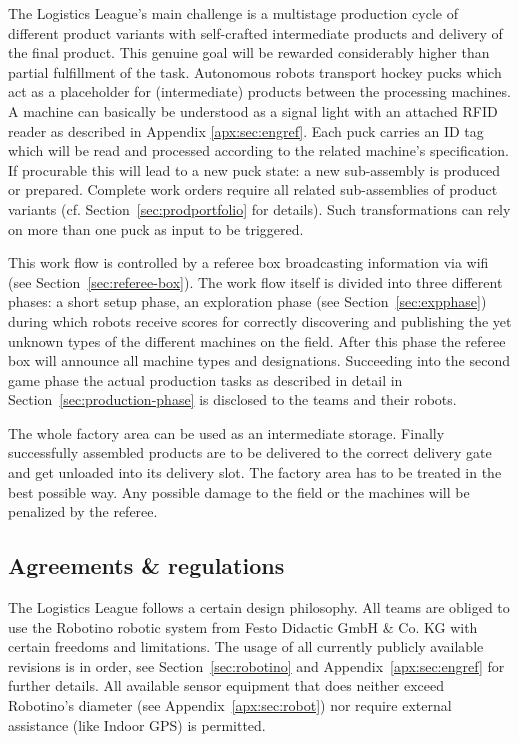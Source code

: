 \documentclass[12pt,twoside]{article}
\newcommand{\refsec}[1]{Section~\ref{#1}}
\begin{document}
The Logistics League's main challenge is a multistage production
cycle of different product variants with self-crafted intermediate
products and delivery of the final product. This genuine goal will be
rewarded considerably higher than partial fulfillment of the task.
Autonomous robots transport hockey pucks which act as a placeholder
for (intermediate) products between the processing machines. A machine
can basically be understood as a signal light with an attached RFID
reader as described in Appendix \ref{apx:sec:engref}. Each puck
carries an ID tag which will be read and processed according to the
related machine's specification. If procurable this will lead to a new
puck state: a new sub-assembly is produced or prepared. Complete
work orders require all related sub-assemblies of product variants (cf.
\refsec{sec:prodportfolio} for details). Such transformations can rely
on more than one puck as input to be triggered.

This work flow is controlled by a referee box broadcasting information
via wifi (see \refsec{sec:referee-box}). The work flow itself is
divided into three different phases: a short setup phase, an
exploration phase (see \refsec{sec:expphase}) during which robots
receive scores for correctly discovering and publishing the yet
unknown types of the different machines on the field. After this phase
the referee box will announce all machine types and
designations. Succeeding into the second game phase the actual
production tasks as described in detail in
\refsec{sec:production-phase} is disclosed to the teams and their
robots.

The whole factory area can be used as an intermediate storage. Finally
successfully assembled products are to be delivered to the correct
delivery gate and get unloaded into its delivery slot. The factory area
has to be treated in the best possible way. Any possible damage to the
field or the machines will be penalized by the referee.

\subsection{Agreements \& regulations} \label{sec:agreements}

The Logistics League follows a certain design philosophy. All teams
are obliged to use the Robotino robotic system from Festo Didactic
GmbH \& Co. KG with certain freedoms and limitations. The usage of all
currently publicly available revisions is in order, see
\refsec{sec:robotino} and Appendix~\ref{apx:sec:engref} for further
details. All available sensor equipment that does neither exceed
Robotino's diameter (see Appendix~\ref{apx:sec:robot}) nor require
external assistance (like Indoor GPS) is permitted.
\end{document}
